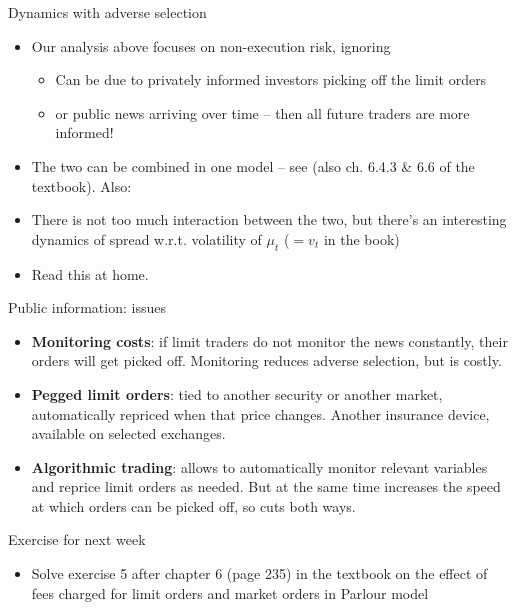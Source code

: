 \documentclass[english,10pt
,aspectratio=169
]{beamer}
\begin{document}
\begin{frame}{Dynamics with adverse selection}
	\begin{itemize}
		\item Our analysis above focuses on non-execution risk, ignoring 
		\begin{itemize}
			\item Can be due to privately informed investors picking off the limit orders
			\item or \alert{public news} arriving over time -- then all future traders are more informed!
		\end{itemize}
		\item The two can be combined in one model -- see \cite{foucault_order_1999} (also ch. 6.4.3 \& 6.6 of the textbook). Also: \hyperlink{adverse}{}
		\item There is not too much interaction between the two, but there's an interesting dynamics of spread w.r.t. volatility of $\mu_t$ ($=v_t$ in the book)
		\item Read this at home.
	\end{itemize}
\end{frame}


\begin{frame}{Public information: issues}
	\begin{itemize}[<+->]
		\item \textbf{Monitoring costs}: if limit traders do not monitor the news constantly, their orders will get picked off. Monitoring reduces adverse selection, but is costly.
		\item \textbf{Pegged limit orders}: tied to another security or another market, automatically repriced when that price changes. Another insurance device, available on selected exchanges.
		\item \textbf{Algorithmic trading}: allows to automatically monitor relevant variables and reprice limit orders as needed. But at the same time increases the speed at which orders can be picked off, so cuts both ways.
	\end{itemize}
\end{frame}


\begin{frame}{Exercise for next week}
	\begin{itemize}
		\item Solve exercise 5 after chapter 6 (page 235) in the textbook on the effect of fees charged for limit orders and market orders in Parlour model
	\end{itemize}
\end{frame}
\end{document}
